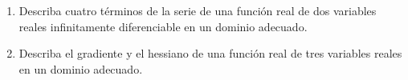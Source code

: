 \begin{frame}
\begin{enumerate}
\begin{enumerate}
			            Describa cuatro términos de la serie de Taylor de una función real
			            de variable real infinitamente diferenciable en un dominio
			            adecuado.

			      \item

			            Describa cuatro términos de la serie de una función real de dos
			            variables reales infinitamente diferenciable en un dominio
			            adecuado.

			      \item

			            Describa el gradiente y el hessiano de una función real de tres
			            variables reales en un dominio adecuado.
		      \end{enumerate}
	\end{enumerate}
\end{frame}
